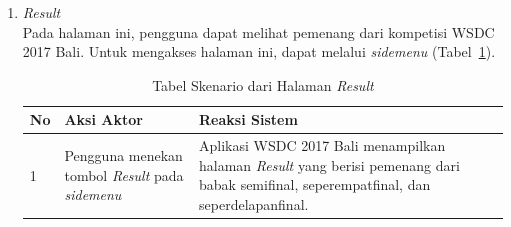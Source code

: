 \begin{enumerate}
	\newpage
	\item \textit{Result} \\ 
	Pada halaman ini, pengguna dapat melihat pemenang dari kompetisi WSDC 2017 Bali. Untuk mengakses halaman ini, dapat melalui \textit{sidemenu} (Tabel~\ref{table:skenarioHalamanHasil}).
		\begin{table}[H]
			\centering
			\begin{tabular}{|p{0.5cm}|p{7cm}|p{7cm}|}
				\hline
				No & Aksi Aktor                               & Reaksi Sistem                                          \\ \hline
				1  & Pengguna menekan tombol \textit{Result} pada \textit{sidemenu} & Aplikasi WSDC 2017 Bali menampilkan halaman \textit{Result} yang berisi pemenang dari babak semifinal, seperempatfinal, dan seperdelapanfinal. \\ \hline
			\end{tabular}
			\caption{Tabel Skenario dari Halaman \textit{Result}}
			\label{table:skenarioHalamanHasil}
		\end{table}


\end{enumerate}
